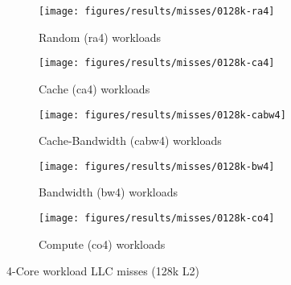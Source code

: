\begin{figure}
    \centering
    \begin{subfigure}[b]{\textwidth}
            \texttt{[image: figures/results/misses/0128k-ra4]}
            \caption{Random (ra4) workloads}
            \label{fig:results:4core:misses:random}
    \end{subfigure}

    \begin{subfigure}[b]{0.5\textwidth}
            \texttt{[image: figures/results/misses/0128k-ca4]}
            \caption{Cache (ca4) workloads}
            \label{fig:results:4core:misses:cache}
    \end{subfigure}%
    \begin{subfigure}[b]{0.5\textwidth}
            \texttt{[image: figures/results/misses/0128k-cabw4]}
            \caption{Cache-Bandwidth (cabw4) workloads}
            \label{fig:results:4core:misses:cache-bw}
    \end{subfigure}

    \begin{subfigure}[b]{0.5\textwidth}
            \texttt{[image: figures/results/misses/0128k-bw4]}
            \caption{Bandwidth (bw4) workloads}
            \label{fig:results:4core:misses:bw}
    \end{subfigure}%
    \begin{subfigure}[b]{0.5\textwidth}
            \texttt{[image: figures/results/misses/0128k-co4]}
            \caption{Compute (co4) workloads}
            \label{fig:results:4core:misses:co}
    \end{subfigure}%

    \caption{4-Core workload LLC misses (128k L2)}\label{fig:results:4core:misses}
\end{figure}

